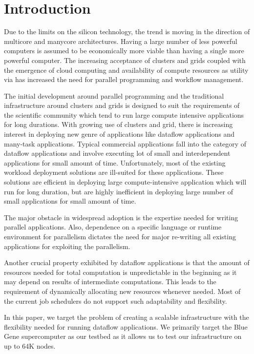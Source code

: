 \documentclass[conference]{IEEEtran}
\begin{document}
\IEEEpeerreviewmaketitle

\section{Introduction}

Due to the limits on the silicon technology, the trend is moving in the
direction of multicore and manycore architectures.  Having a large number of
less powerful computers is assumed to be economically more viable than having a
single more powerful computer.  The increasing acceptance of clusters and
grids coupled with the emergence of cloud computing and availability of compute
resources as utility via \cite{ec2} \cite{azure} \cite{appengine} has increased
the need for parallel programming and workflow management.

The initial development around parallel programming and the traditional
infrastructure around clusters and grids is designed to suit the
requirements of the scientific community which tend to run large compute
intensive applications for long durations.  With growing use of clusters and
grid, there is increasing interest in deploying new genre of applications like
dataflow applications and many-task applications. Typical commercial
applications fall into the category of dataflow applications and involve
executing lot of small and interdependent applications for small amount of time.
Unfortunately, most of the existing workload deployment solutions are ill-suited
for these applications. These solutions are efficient in deploying large
compute-intensive application which will run for long duration, but are highly
inefficient in deploying large number of small applications for small amount of
time.

The major obstacle in widespread adoption is the expertise needed for writing
parallel applications.  Also, dependence on a specific language or runtime
environment for parallelism dictates the need for major re-writing all existing
applications for exploiting the parallelism.


Another crucial property exhibited by dataflow applications is that the amount
of resources needed for total computation is unpredictable in the beginning as
it may depend on results of intermediate computations.  This leads to the
requirement of dynamically allocating new resources whenever needed. Most of the
current job schedulers do not support such adaptability and flexibility.


In this paper, we target the problem of creating a scalable infrastructure
with the flexibility needed for running dataflow applications.  We primarily
target the Blue Gene \cite{bgp} supercomputer as our testbed as it allows us to
test our infrastructure on up to 64K nodes.
\end{document}
